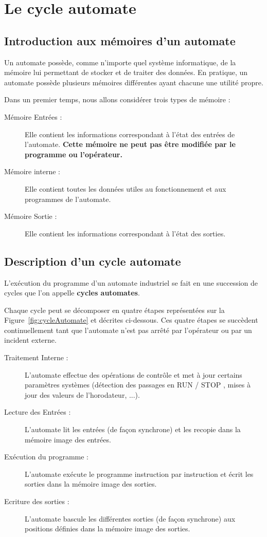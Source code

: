 
\section{Le cycle automate}
\subsection{Introduction aux mémoires d'un automate}
Un automate possède, comme n'importe quel système informatique, de la mémoire lui permettant de stocker et de traiter des données. En pratique, un automate possède plusieurs mémoires différentes ayant chacune une utilité propre.

Dans un premier temps, nous allons considérer trois types de mémoire :
\begin{description}
  \item [Mémoire Entrées : ] Elle contient les informations correspondant à l'état des entrées de l'automate. \textbf{\color{red} Cette mémoire ne peut pas être modifiée par le programme ou l'opérateur.}
  \item [Mémoire interne : ] Elle contient toutes les données utiles au fonctionnement et aux programmes de l'automate.
  \item [Mémoire Sortie : ] Elle contient les informations correspondant à l'état des sorties.
\end{description}
\subsection{Description d'un cycle automate}

L'exécution du programme d'un automate industriel se fait en une succession de cycles que l'on appelle \textbf{cycles automates}.

Chaque cycle peut se décomposer en quatre étapes représentées sur la Figure~\ref{fig:cycleAutomate} et décrites ci-dessous. Ces quatre étapes se succèdent continuellement tant que l'automate n'est pas arrêté par l'opérateur ou par un incident externe.
\begin{description}
  \item[Traitement Interne : ] L'automate effectue des opérations de contrôle et met à jour certains paramètres systèmes (détection des passages en RUN / STOP , mises à jour des valeurs de l'horodateur, ...).
  \item[Lecture des Entrées : ]  L'automate lit les entrées (de façon synchrone) et les recopie dans la mémoire image des entrées.
  \item[Exécution du programme : ] L'automate exécute le programme instruction par instruction et écrit les sorties dans la mémoire image des sorties.
  \item[Ecriture des sorties : ] L'automate bascule les différentes sorties (de façon synchrone) aux positions définies dans la mémoire image des sorties.
\end{description}

